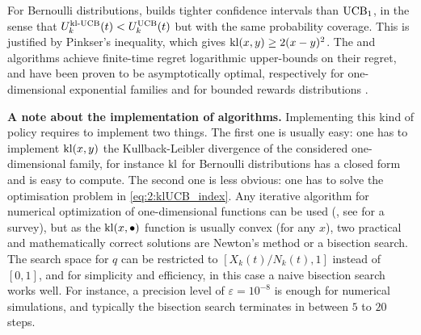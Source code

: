 For Bernoulli distributions, \klUCB{} builds tighter confidence intervals than $\mathrm{UCB}_1$, in the sense that $U_k^{\mathrm{kl}\text{-}\mathrm{UCB}}(t) < U_k^{\mathrm{UCB}}(t)$
but with the same probability coverage.
This is justified by Pinkser's inequality, which gives $\mathrm{kl}(x,y) \geq 2(x-y)^2$.
%
The \KLUCB{} and \klUCB{} algorithms achieve finite-time regret logarithmic upper-bounds on their regret, and have been proven to be asymptotically optimal, respectively for one-dimensional exponential families and for bounded rewards distributions \cite{Garivier11KL,KLUCBJournal}.


\textbf{A note about the implementation of \klUCB{} algorithms.}
%
Implementing this kind of policy requires to implement two things.
The first one is usually easy: one has to implement $\mathrm{kl}(x,y)$ the Kullback-Leibler divergence of the considered one-dimensional family,
for instance $\mathrm{kl}$ for Bernoulli distributions has a closed form and is easy to compute.
The second one is less obvious: one has to solve the optimisation problem in \eqref{eq:2:klUCB_index}.
Any iterative algorithm for numerical optimization of one-dimensional functions can be used (\eg, see \cite{BoydVanderberghe04} for a survey), but as the $\mathrm{kl}(x,\bullet)$ function is usually convex (for any $x$), two practical and mathematically correct solutions are Newton's method or a bisection search.
The search space for $q$ can be restricted to $[ X_k(t) / N_k(t), 1 ]$ instead of $[0,1]$,
and for simplicity and efficiency, in this case a naive bisection search works well.
For instance, a precision level of $\varepsilon=10^{-8}$ is enough for numerical simulations, and typically the bisection search terminates in between $5$ to $20$ steps.

